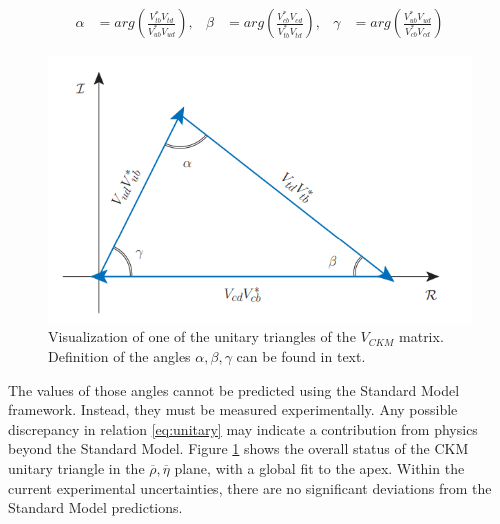 \begin{align*}
   \alpha &= arg\left( \frac{V_{tb}^{*}V_{td}}{V_{ub}^{*}V_{ud}} \right), & 
   \beta &=  arg\left( \frac{V_{cb}^{*}V_{cd}}{V_{tb}^{*}V_{td}} \right), &
   \gamma &= arg\left( \frac{V_{ub}^{*}V_{ud}}{V_{cb}^{*}V_{cd}} \right) 
\end{align*}



\begin{figure}[h]
\centering
\includegraphics[scale=0.8]{figures/Unitary_triangle.PNG}
\caption{Visualization of one of the unitary triangles of the $V_{CKM}$ matrix. Definition of the angles $\alpha, \beta, \gamma$ can be found in text.   
\label{fig:triangle}}
\end{figure}

The values of those angles cannot be predicted using the Standard Model framework. Instead, they must be measured experimentally. Any possible discrepancy in relation \ref{eq:unitary} may indicate a contribution from physics beyond the Standard Model. Figure \ref{fig:triangle} shows the overall status of the CKM unitary triangle in the $\overline{\rho}, \overline{\eta}$ plane, with a global fit to the apex. Within the current experimental uncertainties, there are no significant deviations from the Standard Model predictions. 

